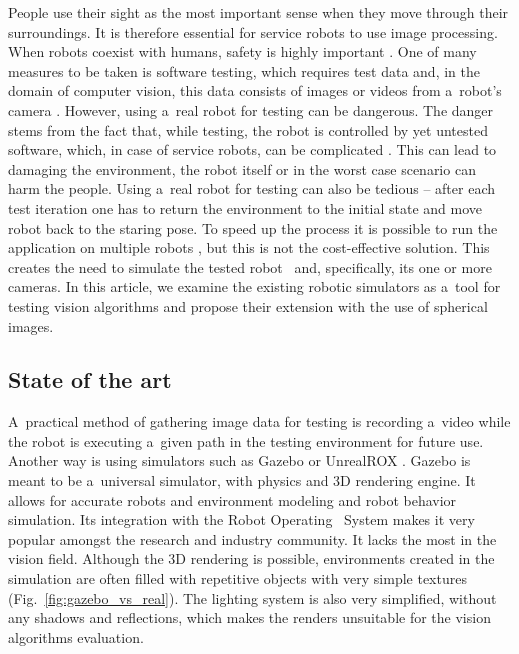 \documentclass[conference]{ieeetran}
\begin{document}
People use their sight as the most important sense when they move through their surroundings.
It is therefore essential for service robots to use image processing.
When robots coexist with humans, safety is highly important \cite{haddadin2007safety}.
One of many measures to be taken is software testing,
which requires test data and, in the domain of computer vision, this data consists of images or videos from a~robot's camera \cite{7759425}.
However, using a~real robot for testing can be dangerous.
The danger stems from the fact that, while testing, the robot is controlled by yet untested software, which, in case of service robots, can be complicated \cite{Dudek-multitasking-romoco-2019-twiki}. This can lead to damaging the environment, the robot itself or in the worst case scenario can harm the people.
Using a~real robot for testing can also be tedious -- after each test iteration one has to return the environment to the initial state and move robot back to the staring pose.
To speed up the process it is possible to run the application on multiple robots \cite{levine2018learning}, but this is not the cost-effective solution.
This creates the need to simulate the tested robot~\cite{seredynski2016graph} and, specifically, its one or more cameras. 
In this article, we examine the existing robotic simulators as a~tool for testing vision algorithms and propose
their extension with the use of spherical images.

\subsection{State of the art}

A~practical method of gathering image data for testing is recording a~video while the robot is executing a~given path in the testing environment for future use.
Another way is using simulators such as Gazebo \cite{koenig2004design} or UnrealROX \cite{martinez2019unrealrox}.
Gazebo is meant to be a~universal simulator, with physics and 3D rendering engine. It allows for accurate 
robots and environment modeling and robot behavior simulation. Its integration with the Robot Operating \
System makes it very popular amongst the research and industry community. It lacks the most in the vision 
field. Although the 3D rendering is possible, environments created in the simulation are often filled
with repetitive objects with very simple textures (Fig.~\ref{fig:gazebo_vs_real}).
 The lighting system is also very simplified, without any 
shadows and reflections, which makes the renders unsuitable for the vision algorithms evaluation. 
\end{document}
